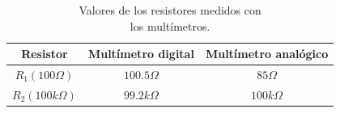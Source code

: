 \documentclass{article}
\begin{document}
\begin{table}[!hbt]
	\begin{center}
	\begin{tabular}{|c|c|c|}
		\hline
		\textbf{Resistor} & \textbf{Multímetro digital} & \textbf{Multímetro analógico} \\
		\hline
		$R_1 (100\Omega)$ & $100.5\Omega$ & $85\Omega$ \\
		\hline
		$R_2 (100k\Omega)$ & $99.2k\Omega$ & $100k\Omega$ \\
		\hline
	\end{tabular}
	\caption{Valores de los resistores medidos con\\ los multímetros.}
	\end{center}
\end{table}
\bigskip



\end{document}
